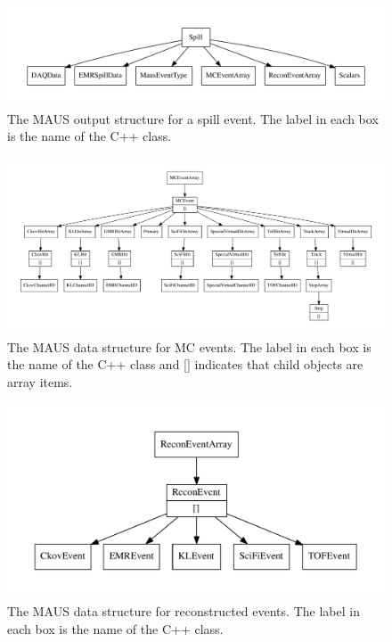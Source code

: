 \documentclass[11pt]{article}
\begin{document}
\begin{figure}[!p]
\centering
\includegraphics[width=\textwidth]{figs/spill_datastructure.pdf}
\caption{The MAUS output structure for a spill event. The label in each box is the name of the C++ class.}
\label{fig:datastructure-spill}
\end{figure}

\begin{figure}[ptb]
\centering
\includegraphics[width=\textwidth]{figs/mc_datastructure.pdf}
\caption{The MAUS data structure for MC events. The label in each box is the name of the C++ class and [] indicates that child objects are array items.}
\label{fig:datastructure-mc}
\end{figure}

\begin{figure}[ptb]
\centering
\includegraphics[width=\textwidth]{figs/recon_datastructure.pdf}
\caption{The MAUS data structure for reconstructed events. The label in each box is the name of the C++ class.}
\label{fig:datastructure-recon}
\end{figure}
\end{document}
